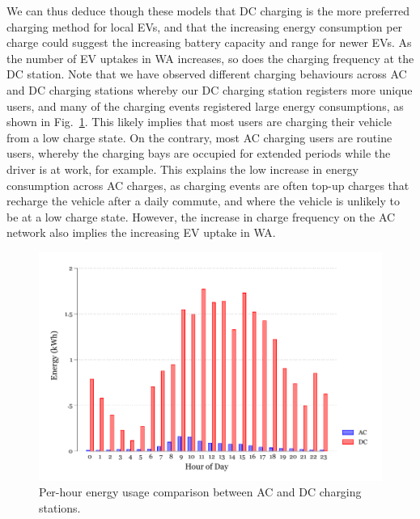 We can thus deduce though these models that DC charging is the more preferred charging method for local EVs, and that the increasing energy consumption per charge could suggest the increasing battery capacity and range for newer EVs. As the number of EV uptakes in WA increases, so does the charging frequency at the DC station. Note that we have observed different charging behaviours across AC and DC charging stations whereby our DC charging station registers more unique users, and many of the charging events registered large energy consumptions, as shown in Fig.~\ref{fig:9:energy-cons}. This likely implies that most users are charging their vehicle from a low charge state. On the contrary, most AC charging users are routine users, whereby the charging bays are occupied for extended periods while the driver is at work, for example. This explains the low increase in energy consumption across AC charges, as charging events are often top-up charges that recharge the vehicle after a daily commute, and where the vehicle is unlikely to be at a low charge state. However, the increase in charge frequency on the AC network also implies the increasing EV uptake in WA.

\begin{figure}[H]
	\centering
	\includegraphics[width=\linewidth]{energy_consumption}
	\caption{Per-hour energy usage comparison between AC and DC charging stations.}
	\label{fig:9:energy-cons}
\end{figure}

